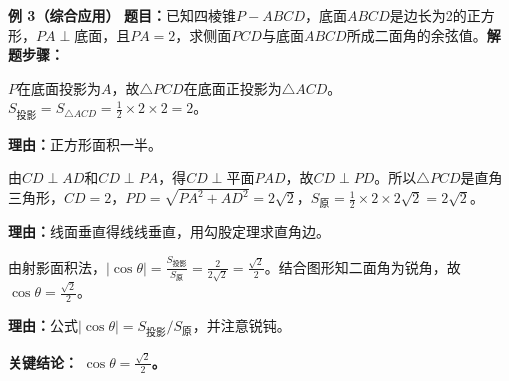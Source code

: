 \begin{examplebox}
	\medskip
	\textbf{\textcolor{CExample}{例 3（综合应用）}}
	\textbf{\textcolor{CExample}{题目：}}已知四棱锥$P-ABCD$，底面$ABCD$是边长为2的正方形，$PA\perp$底面，且$PA=2$，求侧面$PCD$与底面$ABCD$所成二面角的余弦值。\textbf{\textcolor{CExample}{解题步骤：}}
	\begin{description}[style=nextline,leftmargin=2.8em,labelsep=0.5em,itemsep=0.45em]
		\item[\textbf{第一步（求投影面积）：}]
			$P$在底面投影为$A$，故$\triangle PCD$在底面正投影为$\triangle ACD$。$S_{\text{投影}}=S_{\triangle ACD}=\frac12\times2\times2=2$。
			\par\textbf{理由：}正方形面积一半。
		\item[\textbf{第二步（求侧面$PCD$面积）：}]
			由$CD\perp AD$和$CD\perp PA$，得$CD\perp$平面$PAD$，故$CD\perp PD$。所以$\triangle PCD$是直角三角形，$CD=2$，$PD=\sqrt{PA^2+AD^2}=2\sqrt{2}$，$S_{\text{原}}=\frac12\times2\times2\sqrt{2}=2\sqrt{2}$。
			\par\textbf{理由：}线面垂直得线线垂直，用勾股定理求直角边。
		\item[\textbf{第三步（求二面角余弦）：}]
			由射影面积法，$|\cos\theta|=\frac{S_{\text{投影}}}{S_{\text{原}}}=\frac{2}{2\sqrt{2}}=\frac{\sqrt{2}}{2}$。结合图形知二面角为锐角，故$\cos\theta=\frac{\sqrt{2}}{2}$。
			\par\textbf{理由：}公式$|\cos\theta|=S_{\text{投影}}/S_{\text{原}}$，并注意锐钝。
	\end{description}
	\textbf{\textcolor{CExample}{关键结论：}}
	\textbf{$\cos\theta=\frac{\sqrt{2}}{2}$。}
\end{examplebox}
